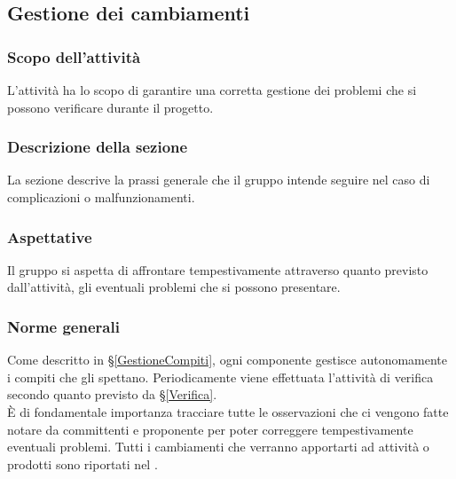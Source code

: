 \subsection{Gestione dei cambiamenti}\label{GestioneCambiamenti}
\subsubsection{Scopo dell'attività} 
L'attività ha lo scopo di garantire una corretta gestione dei problemi che si possono verificare durante il progetto.

\subsubsection{Descrizione della sezione} 
La sezione descrive la prassi generale che il gruppo intende seguire nel caso di complicazioni o malfunzionamenti.

\subsubsection{Aspettative}
Il gruppo si aspetta di affrontare tempestivamente attraverso quanto previsto dall'attività, gli eventuali problemi che si possono presentare.

\subsubsection{Norme generali} \label{GCambiamenti_Norme}
Come descritto in \S\ref{GestioneCompiti}, ogni componente gestisce autonomamente i compiti che gli spettano. Periodicamente viene effettuata l'attività di verifica secondo quanto previsto da \S\ref{Verifica}.\\ È di fondamentale importanza tracciare tutte le osservazioni che ci vengono fatte notare da committenti e proponente per poter correggere tempestivamente eventuali problemi. 
Tutti i cambiamenti che verranno apportarti ad attività o prodotti sono riportati nel {\PdQ}.

